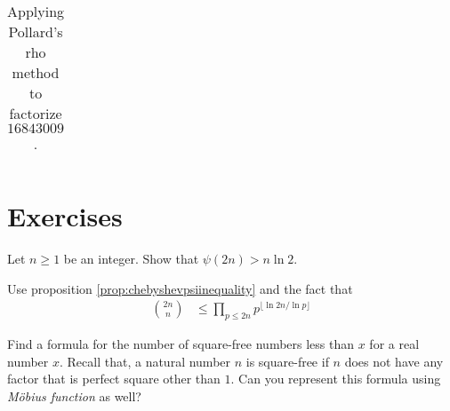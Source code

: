 \begin{example}
\begin{table}
\begin{tabular}{|c|c|c|c|}
				\hline
			\end{tabular}
			\caption{Applying Pollard's rho method to factorize $16843009$.}
			\label{table:pollardmodified}
	\end{table}
\end{example}

\newpage
\section{Exercises}

\begin{problem}
	Let $n \geq 1$ be an integer. Show that $\psi(2n) >n \ln 2$.
\end{problem}

\begin{hint}
	Use proposition \eqref{prop:chebyshevpsiinequality} and the fact that
		\begin{align*}
			\binom{2n}{n}
				& \leq \prod_{p \leq 2n} p^{\lfloor\ln 2n/\ln p\rfloor }
		\end{align*}
\end{hint}

\begin{problem}
	Find a formula for the number of square-free numbers less than $x$ for a real number $x$. Recall that, a natural number $n$ is square-free if $n$ does not have any factor that is perfect square other than $1$. Can you represent this formula using \textit{M\" obius function} as well?
\end{problem}

